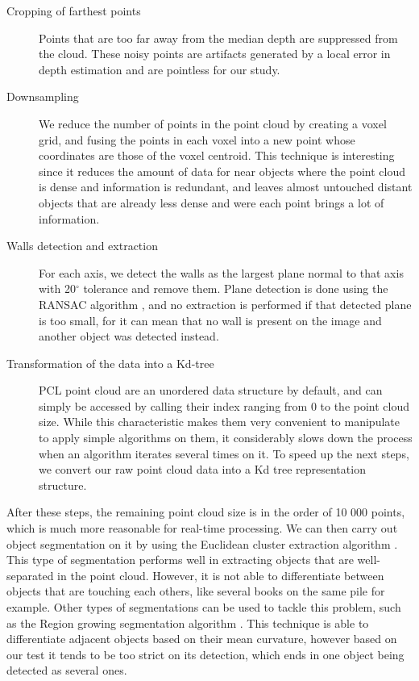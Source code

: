 \begin{description}
    \item[Cropping of farthest points] Points that are too far away from the median depth are suppressed from the cloud. These noisy points are artifacts generated by a local error in depth estimation and are pointless for our study.

    \item[Downsampling] We reduce the number of points in the point cloud by creating a voxel grid, and fusing the points in each voxel into a new point whose coordinates are those of the voxel centroid. This technique is interesting since it reduces the amount of data for near objects where the point cloud is dense and information is redundant, and leaves almost untouched distant objects that are already less dense and were each point brings a lot of information.

    \item[Walls detection and extraction] For each axis, we detect the walls as the largest plane normal to that axis with 20$^\circ$ tolerance and remove them. Plane detection is done using the RANSAC algorithm \cite{RANSAC}, and no extraction is performed if that detected plane is too small, for it can mean that no wall is present on the image and another object was detected instead.

    \item[Transformation of the data into a Kd-tree] PCL point cloud are an unordered data structure by default, and can simply be accessed by calling their index ranging from 0 to the point cloud size. While this characteristic makes them very convenient to manipulate to apply simple algorithms on them, it considerably slows down the process when an algorithm iterates several times on it. To speed up the next steps, we convert our raw point cloud data into a Kd tree representation structure.
\end{description}

After these steps, the remaining point cloud size is in the order of 10 000 points, which is much more reasonable for real-time processing. We can then carry out object segmentation on it by using the Euclidean cluster extraction algorithm \cite{euclidean_cluster_extraction}. This type of segmentation performs well in extracting objects that are well-separated in the point cloud. However, it is not able to differentiate between objects that are touching each others, like several books on the same pile for example. Other types of segmentations can be used to tackle this problem, such as the Region growing segmentation algorithm \cite{region_growing_seg}. This technique is able to differentiate adjacent objects based on their mean curvature, however based on our test it tends to be too strict on its detection, which ends in one object being detected as several ones. 

